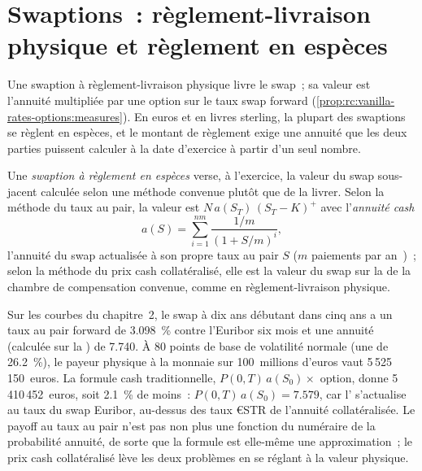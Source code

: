 \section{Swaptions~: règlement-livraison physique et règlement en espèces}

Une swaption à règlement-livraison physique livre le swap~; sa valeur est l'annuité
multipliée par une option sur le taux swap forward
(\cref{prop:rc:vanilla-rates-options:measures}). En euros et en livres sterling, la plupart des
swaptions se règlent en espèces, et le montant de règlement exige une annuité que
les deux parties puissent calculer à la date d'exercice à partir d'un seul nombre.

\begin{definition}\label{def:rc:vanilla-rates-options:cash}
Une \emph{swaption à règlement en espèces} verse, à
l'exercice, la valeur du swap sous-jacent calculée selon une méthode convenue
plutôt que de la livrer. Selon la méthode du taux au pair, la valeur est
$N\,a(S_T)\,(S_T-K)^+$ avec l'\emph{annuité cash}
\[
a(S) = \sum_{i=1}^{nm}\frac{1/m}{(1+S/m)^i},
\]
l'annuité du swap actualisée à son propre taux au pair $S$ ($m$ paiements par
an~)~; selon la méthode du prix cash collatéralisé, elle est la valeur du swap sur la
 de la chambre de compensation convenue, comme en règlement-livraison physique.
\end{definition}

\label{lst:rc:vanilla-rates-options:cash}

\begin{example}\label{ex:rc:vanilla-rates-options:swaption}
Sur les courbes du chapitre~2, le swap à dix ans débutant dans cinq ans a un taux au pair
forward de 3.098~\% contre l'Euribor six mois et une annuité (calculée sur la ) de
7.740. À 80 points de base de volatilité normale (une  de
26.2~\%), le payeur physique à la monnaie sur 100~millions d'euros vaut
5\,525\,150~euros. La formule cash traditionnelle, $P(0,T)\,a(S_0)\times$ option,
donne 5\,410\,452~euros, soit 2.1~\% de moins~: $P(0,T)\,a(S_0) = 7.579$, car
l' s'actualise au taux du swap Euribor, au-dessus des taux €STR de
l'annuité collatéralisée. Le payoff au taux au pair n'est pas non plus une fonction du
numéraire de la probabilité annuité, de sorte que la formule est elle-même une approximation~; le
prix cash collatéralisé lève les deux problèmes en se réglant à la
valeur physique.
\end{example}

